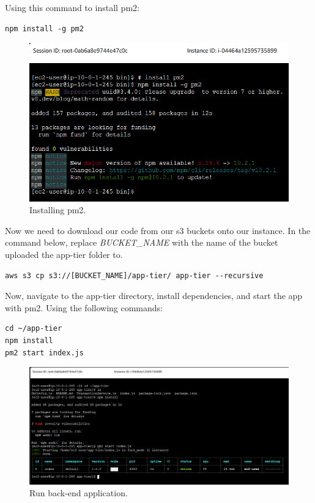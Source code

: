 \documentclass{article}
\begin{document}
Using this command to install pm2:\par
\begin{lstlisting}
npm install -g pm2
\end{lstlisting}

\begin{figure}[h]
    \centering
    \includegraphics{Pictures/App-tier/install pm2.png}
    \caption{Installing pm2.}
    \label{fig:enter-label}
\end{figure}

\newpage
Now we need to download our code from our s3 buckets onto our instance. In the command below, replace \textit{BUCKET\_NAME} with the name of the bucket uploaded the app-tier folder to.\par
\begin{lstlisting}
aws s3 cp s3://[BUCKET_NAME]/app-tier/ app-tier --recursive
\end{lstlisting}

Now, navigate to the app-tier directory, install dependencies, and start the app with pm2. Using the following commands:\par
\begin{lstlisting}
cd ~/app-tier
npm install
pm2 start index.js
\end{lstlisting}

\begin{figure}[h]
    \centering
    \includegraphics[width=12cm]{Pictures/App-tier/run_app.png}
    \caption{Run back-end application.}
    \label{fig:enter-label}
\end{figure}
\end{document}
